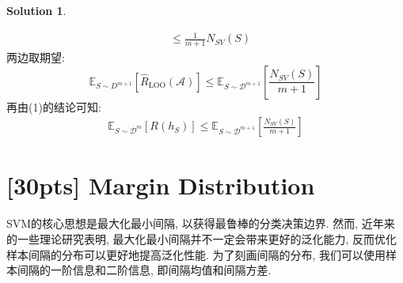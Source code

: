 \documentclass[a4paper,UTF8]{article}
\numberwithin{equation}{section}
\theoremstyle{definition}
\newtheorem*{solution}{Solution}
\begin{document}
\begin{solution}
\begin{enumerate}
\begin{equation}
\begin{aligned}
                & \leq \frac{1}{m+1}N_{SV}(S)
            \end{aligned}
        \end{equation}
        两边取期望:
        $$\mathbb{E}_{S \sim D^{m+1}}[\hat R_{\text{LOO}}(\mathcal{A})] \leq \mathbb{E}_{S \sim \mathcal{D}^{m+1}} \left[\frac{N_{SV}(S)}{m+1}\right] $$
        再由(1)的结论可知:
        \begin{align*}
            \mathbb{E}_{S \sim \mathcal{D}^m}\left[R(h_S)\right] \leq \mathbb{E}_{S \sim \mathcal{D}^{m+1}} \left[\frac{N_{SV}(S)}{m+1}\right]
        \end{align*}
    \end{enumerate}
\end{solution}

\newpage

\section{[30pts] Margin Distribution}
SVM的核心思想是最大化最小间隔, 以获得最鲁棒的分类决策边界. 然而, 近年来的一些理论研究表明, 最大化最小间隔并不一定会带来更好的泛化能力,
反而优化样本间隔的分布可以更好地提高泛化性能. 为了刻画间隔的分布, 我们可以使用样本间隔的一阶信息和二阶信息, 即间隔均值和间隔方差. 
\end{document}
